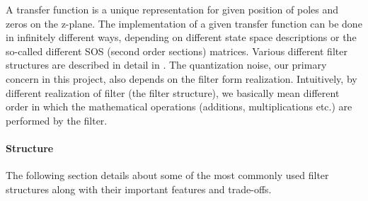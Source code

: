 \documentclass[colorlinks=true,pdfstartview=FitV,linkcolor=blue,
            citecolor=red,urlcolor=magenta]{ligodoc}
\begin{document}
    A transfer function is a unique representation for given position of poles and zeros on the z-plane. The implementation of a given transfer function can be done in infinitely different ways, depending on different state space descriptions or the so-called different SOS (second order sections) matrices. Various different filter structures are described in detail in \cite{Oppenheim}. The quantization noise, our primary concern in this project, also depends on the filter form realization. Intuitively, by different realization of filter (the filter structure), we basically mean different order in which the mathematical operations (additions, multiplications etc.) are performed by the filter. 
    \paragraph{Structure}
The following section details about some of the most commonly used filter structures along with their important features and trade-offs.
\end{document}
